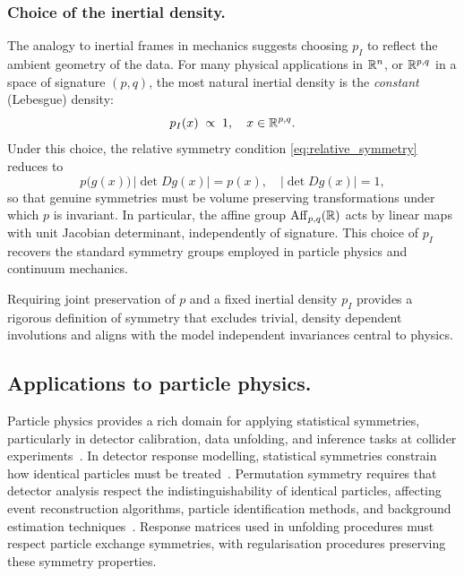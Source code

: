 \subsubsection{Choice of the inertial density.}

The analogy to inertial frames in mechanics suggests choosing $p_I$ to reflect the ambient geometry of the data.  For many physical applications in $\mathbb{R}^n$, or \(\mathbb{R}^{p, q}\) in a space of signature $(p,q)$, the most natural inertial density is the \emph{constant} (Lebesgue) density:
\begin{equation}
    p_I(x) \;\propto\; 1,
    \quad
    x\in\mathbb{R}^{p, q}.
\end{equation}
Under this choice, the relative symmetry condition \cref{eq:relative_symmetry} reduces to 
\[
    \label{eq:equiareal-maps}
    p\bigl(g(x)\bigr)\,\bigl|\det Dg(x)\bigr|
    = p(x),
    \quad
    \bigl|\det Dg(x)\bigr| = 1,
\]
so that genuine symmetries must be volume preserving transformations under which $p$ is invariant.
%
In particular, the affine group $\operatorname{Aff}_{p,q}(\mathbb{R})$ acts by linear maps with unit Jacobian determinant, independently of signature.  This choice of $p_I$ recovers the standard symmetry groups employed in particle physics and continuum mechanics.

Requiring joint preservation of $p$ and a fixed inertial density $p_I$ provides a rigorous definition of symmetry that excludes trivial, density dependent involutions and aligns with the model independent invariances central to physics.    
    \subsection{Applications to particle physics.}
        Particle physics provides a rich domain for applying statistical symmetries, particularly in detector calibration, data unfolding, and inference tasks at collider experiments~\cite{Wilson:2020zey}.
        In detector response modelling, statistical symmetries constrain how identical particles must be treated~\cite{Council1Elementary-ParticleMatter}.
        Permutation symmetry requires that detector analysis respect the indistinguishability of identical particles, affecting event reconstruction algorithms, particle identification methods, and background estimation techniques~\cite{calvo-barles_machine_2025}.
        Response matrices used in unfolding procedures must respect particle exchange symmetries, with regularisation procedures preserving these symmetry properties.

